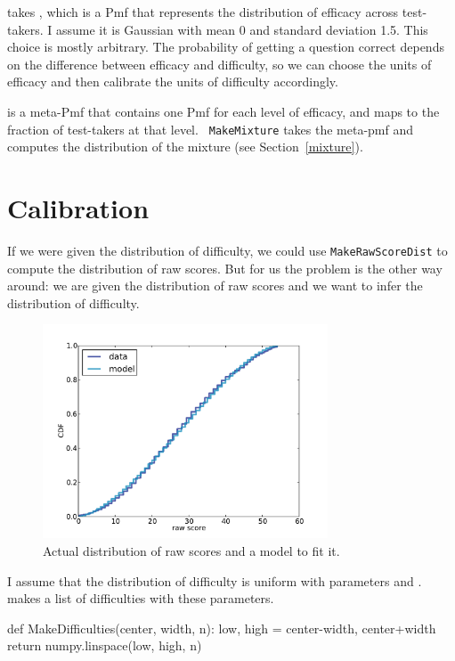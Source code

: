 \documentclass[12pt]{book}
\theoremstyle{exercise}
\begin{document}
 takes , which is a Pmf that
represents the distribution of efficacy across test-takers.  I assume
it is Gaussian with mean 0 and standard deviation 1.5.  This
choice is mostly arbitrary.  The probability of getting a question
correct depends on the difference between efficacy and difficulty, so
we can choose the units of efficacy and then calibrate the units of
difficulty accordingly.  

 is a meta-Pmf that contains one Pmf for each level of
efficacy, and maps to the fraction of test-takers at that level.  {\tt
  MakeMixture} takes the meta-pmf and computes the distribution of the
mixture (see Section~\ref{mixture}).  


\section{Calibration}

If we were given the distribution of difficulty, we could use
\verb"MakeRawScoreDist" to compute the distribution of raw scores.
But for us the problem is the other way around: we are given the
distribution of raw scores and we want to infer the distribution of
difficulty.

\begin{figure}
\centerline{\includegraphics[height=2.5in]{figs/sat_calibrate.pdf}}
\caption{Actual distribution of raw scores and a model to fit it.}
\label{fig.satcalibrate}
\end{figure}

I assume that the distribution of difficulty is uniform with
parameters  and .  
makes a list of difficulties with these parameters.

\begin{code}
def MakeDifficulties(center, width, n):
    low, high = center-width, center+width
    return numpy.linspace(low, high, n)
\end{code}
\end{document}
